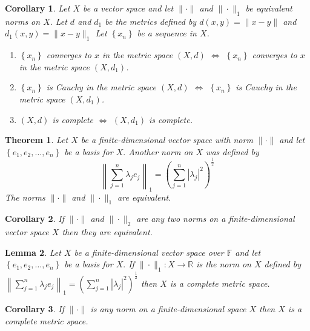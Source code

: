 \documentclass[10pt]{paper}
\newtheorem{theorem}{Theorem}[section]
\newtheorem{corollary}{Corollary}[section]
\newtheorem{lemma}[theorem]{Lemma}
\begin{document}
\begin{corollary}
    Let $X$ be a vector space and let $\|\cdot\|$ and $\|\cdot\|_{1}$ be equivalent norms on $X .$ Let $d$ and $d_{1}$ be the metrics defined by $d(x, y)=\|x-y\|$ and $d_{1}(x, y)=\|x-y\|_{1}$ Let $\left\{x_{n}\right\}$ be a sequence in $X$.
    \begin{enumerate}
        \item $\left\{x_{n}\right\}$ converges to $x$ in the metric space $(X, d)$ $\iff$ $\left\{x_{n}\right\}$ converges to $x$ in the metric space $\left(X, d_{1}\right)$.
        \item $\left\{x_{n}\right\}$ is Cauchy in the metric space $(X, d)$ $\iff$ $\left\{x_{n}\right\}$ is Cauchy in the metric space $\left(X, d_{1}\right)$.
        \item $(X, d)$ is complete $\iff$ $\left(X, d_{1}\right)$ is complete.
    \end{enumerate}
\end{corollary}

\begin{theorem}
    Let $X$ be a finite-dimensional vector space with norm $\|\cdot\|$ and let $\left\{e_{1}, e_{2}, \ldots, e_{n}\right\}$ be a basis for $X .$ Another norm on $X$ was defined by
    $$
        \left\|\sum_{j=1}^{n} \lambda_{j} e_{j}\right\|_{1}=\left(\sum_{j=1}^{n}\left|\lambda_{j}\right|^{2}\right)^{\frac{1}{2}}
    $$
    The norms $\|\cdot\|$ and $\|\cdot\|_{1}$ are equivalent.
\end{theorem}

\begin{corollary}
    If $\|\cdot\|$ and $\|\cdot\|_{2}$ are any two norms on a finite-dimensional vector space $X$ then they are equivalent.
\end{corollary}

\begin{lemma}
    Let $X$ be a finite-dimensional vector space over $\mathbb{F}$ and let $\left\{e_{1}, e_{2}, \ldots, e_{n}\right\}$ be a basis for $X .$ If $\|\cdot\|_{1}: X \rightarrow \mathbb{R}$ is the norm on $X$ defined by $\left\|\sum_{j=1}^{n} \lambda_{j} e_{j}\right\|_{1}=\left(\sum_{j=1}^{n}\left|\lambda_{j}\right|^{2}\right)^{\frac{1}{2}}$ then $X$ is a complete metric space.
\end{lemma}

\begin{corollary}
    If $\|\cdot\|$ is any norm on a finite-dimensional space $X$ then $X$ is a complete metric
    space.
\end{corollary}
\end{document}
